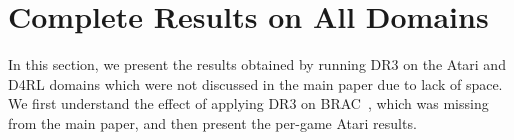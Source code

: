 
\section{Complete Results on All Domains}
\label{app:full_results}



In this section, we present the results obtained by running DR3 on the Atari and D4RL domains which were not discussed in the main paper due to lack of space. We first understand the effect of applying DR3 on BRAC~\citep{wu2019behavior}, which was missing from the main paper, and then present the per-game Atari results. 

